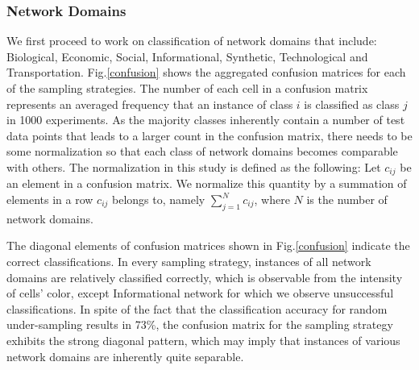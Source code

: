 \documentclass{article}
\begin{document}
 
\subsubsection{Network Domains} 
We first proceed to work on classification of network domains that include: Biological, Economic, Social, Informational, Synthetic, Technological and Transportation.
Fig.\ref{confusion} shows the aggregated confusion matrices for each of the sampling strategies. The number of each cell in a confusion matrix represents an averaged frequency that an instance of class $i$ is classified as class $j$ in 1000 experiments. As the majority classes inherently contain a number of test data points that leads to a larger count in the confusion matrix, there needs to be some normalization so that each class of network domains becomes comparable with others. The normalization in this study is defined as the following: Let $c_{ij}$ be an element in a confusion matrix. We normalize this quantity by a summation of elements in a row $c_{ij}$ belongs to, namely $\sum_{j=1}^N c_{ij}$, where $N$ is the number of network domains. 

The diagonal elements of confusion matrices shown in Fig.\ref{confusion} indicate the correct classifications. In every sampling strategy, instances of all network domains are relatively classified correctly, which is observable from the intensity of cells' color, except Informational network for which we observe unsuccessful classifications. In spite of the fact that the classification accuracy for random under-sampling results in 73\%, the confusion matrix for the sampling strategy exhibits the strong diagonal pattern, which may imply that instances of various network domains are inherently quite separable.
\end{document}
